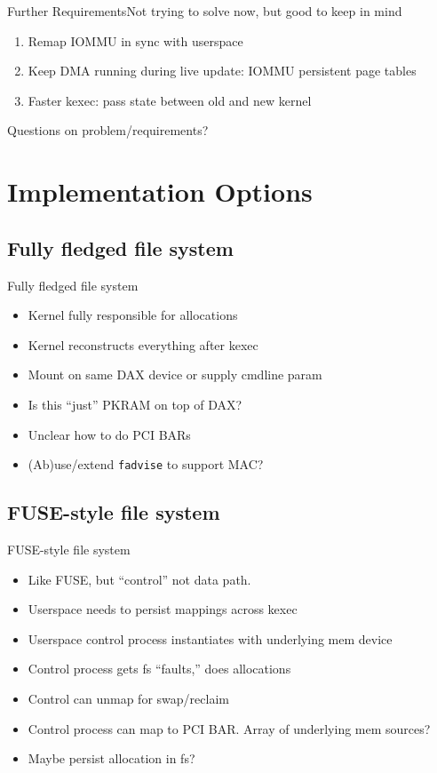 \documentclass{beamer}
\begin{document}
\begin{frame}{Further Requirements}{Not trying to solve now, but good to keep in mind}
  \begin{enumerate}
    \item Remap IOMMU in sync with userspace
    \item Keep DMA running during live update: IOMMU persistent page tables
    \item Faster kexec: pass state between old and new kernel
  \end{enumerate}
  \break
  Questions on problem/requirements?
\end{frame}

\section{Implementation Options}

  \subsection{Fully fledged file system}
  \begin{frame}{Fully fledged file system}
    \begin{itemize}
      \item Kernel fully responsible for allocations
      \item Kernel reconstructs everything after kexec
      \item Mount on same DAX device or supply cmdline param
      \item Is this ``just'' PKRAM on top of DAX?
      \item Unclear how to do PCI BARs
      \item (Ab)use/extend \texttt{fadvise} to support MAC?
    \end{itemize}
  \end{frame}

  \subsection{FUSE-style file system}
  \begin{frame}{FUSE-style file system}
    \begin{itemize}
      \item Like FUSE, but ``control'' not data path.
      \item Userspace needs to persist mappings across kexec
      \item Userspace control process instantiates with underlying mem device
      \item Control process gets fs ``faults,'' does allocations
      \item Control can unmap for swap/reclaim
      \item Control process can map to PCI BAR. Array of underlying mem sources?
      \item Maybe persist allocation in fs?
    \end{itemize}
  \end{frame}
\end{document}
